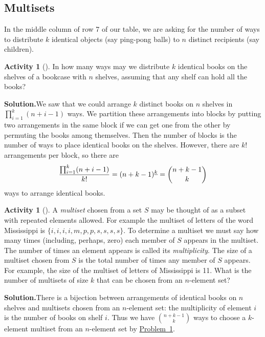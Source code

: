 \documentclass[10pt,]{book}
\theoremstyle{plain}
\theoremstyle{definition}
\newtheorem{activity}[project]{Activity}
\numberwithin{equation}{chapter}
\begin{document}
\subsection[{Multisets}]{Multisets}\label{subsection-9}
In the middle column of row 7 of our table, we are asking for the number of ways to distribute \(k\) identical objects (say ping-pong balls) to \(n\) distinct recipients (say children).%
\begin{activity}[]\label{identicalbooks}
In how many ways may we distribute \(k\) identical books on the shelves of a bookcase with \(n\) shelves, assuming that any shelf can hold all the books?%
\par\medskip\noindent%
\textbf{Solution.}\quad We saw that we could arrange \(k\) distinct books on \(n\) shelves in \(\prod_{i=1}^k (n+i-1)\) ways. We partition these arrangements into blocks by putting two arrangements in the same block if we can get one from the other by permuting the books among themselves. Then the number of blocks is the number of ways to place identical books on the shelves. However, there are \(k!\) arrangements per block, so there are%
\begin{equation*}
{\prod_{i=1}^k (n+i-1)\over k!}=(n+k-1)^{\underline{k}}= {n+k-1\choose
k}
\end{equation*}
ways to arrange identical books.%
\end{activity}
\begin{activity}[]\label{multiset}
A \emph{multiset} chosen from a set \(S\) may be thought of as a subset with repeated elements allowed. For example the multiset of letters of the word Mississippi is \(\{i,i,i,i,m,p,p,s,s,s,s\}\). To determine a multiset we must say how many times (including, perhaps, zero) each member of \(S\) appears in the multiset. The number of times an element appears is called its \emph{multiplicity}. The size of a multiset chosen from \(S\) is the total number of times any member of \(S\) appears. For example, the size of the multiset of letters of Mississippi is 11. What is the number of multisets of size \(k\) that can be chosen from an \(n\)-element set?%
\par\medskip\noindent%
\textbf{Solution.}\quad There is a bijection between arrangements of identical books on \(n\) shelves and multisets chosen from an \(n\)-element set: the multiplicity of element \(i\) is the number of books on shelf \(i\). Thus we have \(n+k-1\choose k\) ways to choose a \(k\)-element multiset from an \(n\)-element set by \hyperref[identicalbooks]{Problem~\ref{identicalbooks}}.%
\end{activity}
\end{document}
